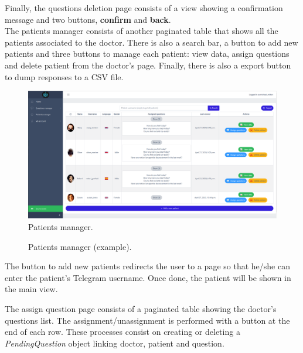 \documentclass[12pt,english]{article}
\begin{document}
Finally, the questions deletion page consists of a view showing a confirmation message and two buttons, \textbf{confirm} and \textbf{back}.
\\

The patients manager consists of another paginated table that shows all the patients associated to the doctor. There is also a search bar, a button to add new patients and three buttons to manage each patient: view data, assign questions and delete patient from the doctor's page. Finally, there is also a export button to dump responses to a CSV file.

\begin{figure}[H]
  \centering
    \includegraphics[width=\textwidth]{patients_manager.png}
  \caption{Patients manager.}
\end{figure}

\begin{figure}[H]
    \caption{Patients manager (example).}
\end{figure}

The button to add new patients redirects the user to a page so that he/she can enter the patient's Telegram username. Once done, the patient will be shown in the main view.

The assign question page consists of a paginated table showing the doctor's questions list. The assignment/unassignment is performed with a button at the end of each row. These processes consist on creating or deleting a \emph{PendingQuestion} object linking doctor, patient and question.
\end{document}
